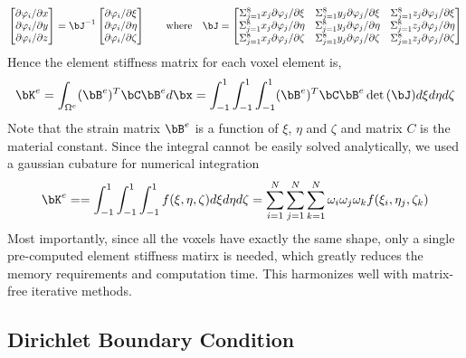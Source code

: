 \documentclass[11pt,titlepage]{article}
\begin{document}
\[
    \begin{bmatrix}
    \partial \varphi_i / \partial x \\
    \partial \varphi_i / \partial y \\
    \partial \varphi_i / \partial z \\
    \end{bmatrix}
    =
    \bJ^{-1}
    \begin{bmatrix}
        \partial \varphi_i / \partial \xi \\
        \partial \varphi_i / \partial \eta \\
        \partial \varphi_i / \partial \zeta \\
    \end{bmatrix}
    \quad\quad
    \text{where}\quad
    \bJ = 
    \begin{bmatrix}
        \Sigma_{j=1}^{8} x_{j} \partial \varphi_j / \partial \xi & \Sigma_{j=1}^{8} y_{j} \partial \varphi_j / \partial \xi & \Sigma_{j=1}^{8} z_{j} \partial \varphi_j / \partial \xi \\
        \Sigma_{j=1}^{8} x_{j} \partial \varphi_j / \partial \eta & \Sigma_{j=1}^{8} y_{j} \partial \varphi_j / \partial \eta & \Sigma_{j=1}^{8} z_{j} \partial \varphi_j / \partial \eta \\
        \Sigma_{j=1}^{8} x_{j} \partial \varphi_j / \partial \zeta & \Sigma_{j=1}^{8} y_{j} \partial \varphi_j / \partial \zeta & \Sigma_{j=1}^{8} z_{j} \partial \varphi_j / \partial \zeta \\
    \end{bmatrix}
\]
Hence the element stiffness matrix for each voxel element is,
\[
    \bK^e = \int_{\Omega^e} (\bB^e)^T \bC \bB^e d\bx
    =
    \int_{-1}^{1}\int_{-1}^{1}\int_{-1}^{1} (\bB^e)^T \bC \bB^e \det{(\bJ)} d\xi d\eta d\zeta
\]
Note that the strain matrix $\bB^{e}$ is a function of $\xi$, $\eta$ and $\zeta$ and matrix $C$ is the material constant. Since the integral cannot be easily solved analytically, we used a gaussian cubature for numerical integration
\[
    \bK^e =
    = \int_{-1}^{1}\int_{-1}^{1}\int_{-1}^{1} f(\xi,\eta,\zeta) d\xi d\eta d\zeta
    = \sum_{i=1}^{N}\sum_{j=1}^{N}\sum_{k=1}^{N}\omega_{i}\omega_{j}\omega_{k}f(\xi_i,\eta_j,\zeta_k)
\]
Most importantly, since all the voxels have exactly the same shape, only a single pre-computed element stiffness matirx is needed, which greatly reduces the memory requirements and computation time. This harmonizes well with matrix-free iterative methods.


\subsection{Dirichlet Boundary Condition}
\end{document}
